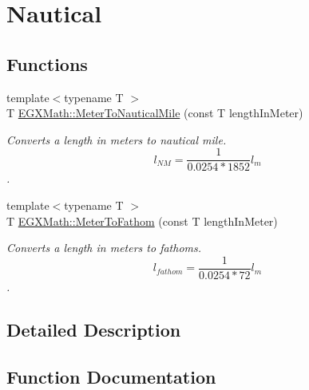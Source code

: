 \hypertarget{group___e_g_x_math-_conversions-_length_conversions-_meter-_nautical}{}\section{Nautical}
\label{group___e_g_x_math-_conversions-_length_conversions-_meter-_nautical}
\subsection*{Functions}
\begin{DoxyCompactItemize}
\item 
{\footnotesize template$<$typename T $>$ }\\T \mbox{\hyperlink{group___e_g_x_math-_conversions-_length_conversions-_meter-_nautical_ga501f0dd53cb3c21d377eac2a18fabdf8}{E\+G\+X\+Math\+::\+Meter\+To\+Nautical\+Mile}} (const T length\+In\+Meter)
\begin{DoxyCompactList}\small\item\em Converts a length in meters to nautical mile. \[ l_{NM}= \frac{1}{0.0254 * 1852} l_{m} \]. \end{DoxyCompactList}\item 
{\footnotesize template$<$typename T $>$ }\\T \mbox{\hyperlink{group___e_g_x_math-_conversions-_length_conversions-_meter-_nautical_gaa66945d01b3da25cb9d52cd15f4aa38e}{E\+G\+X\+Math\+::\+Meter\+To\+Fathom}} (const T length\+In\+Meter)
\begin{DoxyCompactList}\small\item\em Converts a length in meters to fathoms. \[ l_{fathom}= \frac{1}{0.0254 * 72} l_{m} \]. \end{DoxyCompactList}\end{DoxyCompactItemize}


\subsection{Detailed Description}


\subsection{Function Documentation}
\mbox{\label{group___e_g_x_math-_conversions-_length_conversions-_meter-_nautical_gaa66945d01b3da25cb9d52cd15f4aa38e}} 
